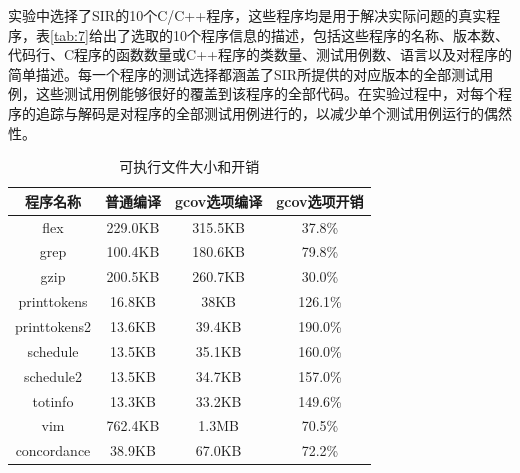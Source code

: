 实验中选择了SIR的10个C/C++程序，这些程序均是用于解决实际问题的真实程序，表\ref{tab:7}给出了选取的10个程序信息的描述，包括这些程序的名称、版本数、代码行、C程序的函数数量或C++程序的类数量、测试用例数、语言以及对程序的简单描述。每一个程序的测试选择都涵盖了SIR所提供的对应版本的全部测试用例，这些测试用例能够很好的覆盖到该程序的全部代码。在实验过程中，对每个程序的追踪与解码是对程序的全部测试用例进行的，以减少单个测试用例运行的偶然性。

\begin{table}[ht]
  \centering
  \caption{可执行文件大小和开销}
  \label{tab:8}
  \begin{tabular}{c|c|c|c}
    \hline
    程序名称& 普通编译& gcov选项编译& gcov选项开销\\ \hline
    flex& 229.0KB& 315.5KB& 37.8\%\\ \hline
    grep& 100.4KB& 180.6KB& 79.8\%\\ \hline
    gzip& 200.5KB& 260.7KB& 30.0\%\\ \hline
    printtokens& 16.8KB& 38KB& 126.1\%\\ \hline
    printtokens2& 13.6KB& 39.4KB& 190.0\%\\ \hline
    schedule& 13.5KB& 35.1KB& 160.0\%\\ \hline
    schedule2& 13.5KB& 34.7KB& 157.0\%\\ \hline
    totinfo& 13.3KB& 33.2KB& 149.6\%\\ \hline
    vim& 762.4KB& 1.3MB& 70.5\%\\ \hline
    concordance& 38.9KB & 67.0KB& 72.2\%\\ \hline
  \end{tabular}
\end{table}

